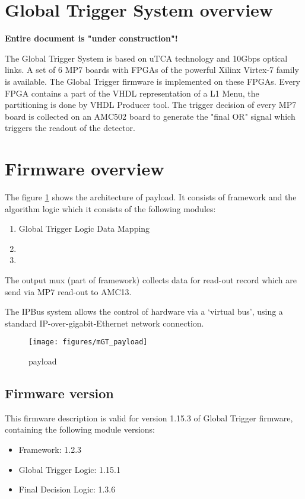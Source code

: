 \section{Global Trigger System overview}\label{sec:gt_system}

\textbf{Entire document is "under construction"!}

The Global Trigger System is based on uTCA technology and 10Gbps optical links. A set of 6 MP7 boards with FPGAs of the powerful Xilinx Virtex-7 family is available. The Global Trigger firmware is implemented on these FPGAs. Every FPGA contains a part of the VHDL representation of a L1 Menu, the partitioning is done by VHDL Producer tool. The trigger decision of every MP7 board is collected on an AMC502 board to generate the "final OR" signal
which triggers the readout of the detector.

\section{Firmware overview}\label{sec:fw}
The figure \ref{fig:mgt} shows the architecture of \ugt payload. It consists of framework and the algorithm logic which it consists of the following modules:
\begin{enumerate}
\item Global Trigger Logic Data Mapping
\item \ugtl
\item \ufdl
\end{enumerate}

The output mux (part of framework) collects data for read-out record which are send via MP7 read-out to AMC13.

The IPBus system allows the control of hardware via a ‘virtual bus’, using a standard IP-over-gigabit-Ethernet network connection.
\begin{figure}[h!]
   \centering
    \texttt{[image: figures/mGT\_payload]}
    \caption{\ugt payload}\label{fig:mgt}
 \end{figure}

\subsection{Firmware version}\label{sec:fw_version}

This firmware description is valid for version 1.15.3 of Global Trigger firmware, containing the following module versions:
\begin{itemize}
\item Framework: 1.2.3
\item Global Trigger Logic: 1.15.1
\item Final Decision Logic: 1.3.6
\end{itemize}

